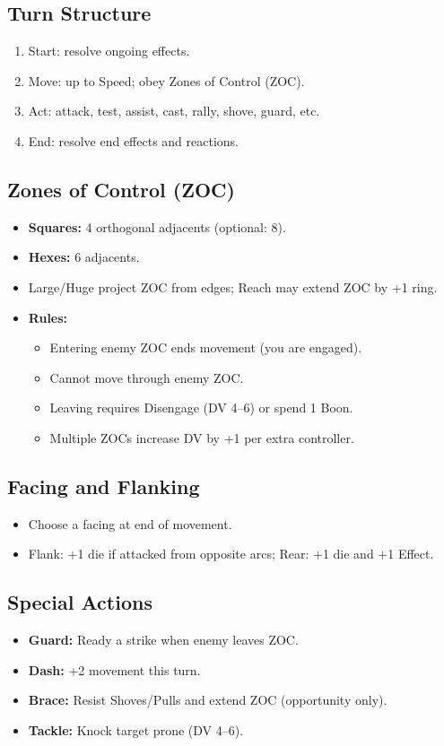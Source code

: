 \subsection{Turn Structure}
\begin{enumerate}
  \item Start: resolve ongoing effects.
  \item Move: up to Speed; obey Zones of Control (ZOC).
  \item Act: attack, test, assist, cast, rally, shove, guard, etc.
  \item End: resolve end effects and reactions.
\end{enumerate}

\subsection{Zones of Control (ZOC)}
\begin{itemize}
  \item \textbf{Squares:} 4 orthogonal adjacents (optional: 8). 
  \item \textbf{Hexes:} 6 adjacents.
  \item Large/Huge project ZOC from edges; Reach may extend ZOC by +1 ring.
  \item \textbf{Rules:} 
    \begin{itemize}
      \item Entering enemy ZOC ends movement (you are engaged).
      \item Cannot move through enemy ZOC.
      \item Leaving requires Disengage (DV 4–6) or spend 1 Boon.
      \item Multiple ZOCs increase DV by +1 per extra controller.
    \end{itemize}
\end{itemize}

\subsection{Facing and Flanking}
\begin{itemize}
  \item Choose a facing at end of movement.
  \item Flank: +1 die if attacked from opposite arcs; Rear: +1 die and +1 Effect.
\end{itemize}

\subsection{Special Actions}
\begin{itemize}
  \item \textbf{Guard:} Ready a strike when enemy leaves ZOC.
  \item \textbf{Dash:} +2 movement this turn.
  \item \textbf{Brace:} Resist Shoves/Pulls and extend ZOC (opportunity only).
  \item \textbf{Tackle:} Knock target prone (DV 4–6).
\end{itemize}

